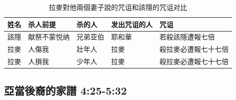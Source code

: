 \begin{table}[!hbp]
\centering
\begin{tabular}{|l|l|l|l|l| }
\hline
姓名 & 杀人前提    &    杀的人 &    发出咒诅的人  &  咒诅 \\\hline
該隱 &献祭不蒙悦纳     &兄弟亚伯 &耶和華 &  若殺該隱遭報七倍\\\hline
拉麥& 人傷我  &壯年人 & 拉麥&殺拉麥必遭報七十七倍 \\
拉麥& 人損我  &少年人 & 拉麥&殺拉麥必遭報七十七倍 \\\hline
\end{tabular}
\caption{拉麥對他兩個妻子說的咒诅和該隱的咒诅对比}
\end{table}


\subsection{亞當後裔的家譜 4:25-5:32}
\label{sec:YaDangJiaPu}
